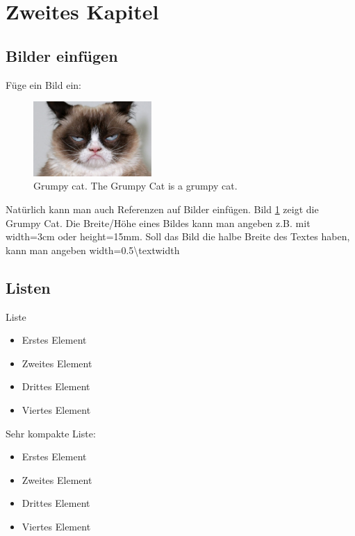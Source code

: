 
\section{Zweites Kapitel}

\lipsum[4]

\subsection{Bilder einfügen}

Füge ein Bild ein:
\begin{figure}[H]
	\centering
	\includegraphics[width=0.4\textwidth]{figures/grumpy_cat}
	\caption[Eintrag in Abbildungsverzeichnis von Grumpy Cat]{Grumpy cat. The Grumpy Cat is a grumpy cat.}
	\label{fig grumpy cat.}
\end{figure}
Natürlich kann man auch Referenzen auf Bilder einfügen.
Bild \ref{fig grumpy cat.} zeigt die Grumpy Cat.
Die Breite/Höhe eines Bildes kann man angeben z.B. mit width=3cm oder height=15mm.
Soll das Bild die halbe Breite des Textes haben, kann man angeben
width=0.5\textbackslash textwidth

\newpage

\subsection{Listen}

Liste
\begin{itemize}
	\item Erstes Element
	\item Zweites Element
	\item Drittes Element
	\item Viertes Element
\end{itemize}

Sehr kompakte Liste:
\begin{itemize}
	\vspace{-\topsep}
	\setlength{\itemsep}{0pt}\setlength{\parskip}{0pt}
	\item Erstes Element
	\item Zweites Element
	\item Drittes Element
	\item Viertes Element
\end{itemize}

